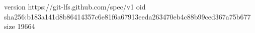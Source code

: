 version https://git-lfs.github.com/spec/v1
oid sha256:b183a141d8b86414357c6e81f6a67913eeda263470eb4c88b99ced367a75b677
size 19664
